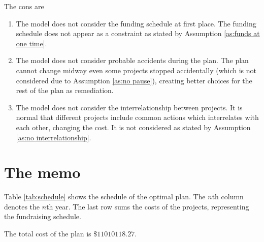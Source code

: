 \documentclass{article}
\begin{document}
The cons are
\begin{enumerate}
\item The model does not consider the funding schedule at first place.
The funding schedule does not appear as a constraint as stated by Assumption \ref{as:funds at one time}.
\item The model does not consider probable accidents during the plan.
The plan cannot change midway even some projects stopped accidentally (which is not considered due to Assumption \ref{as:no pause}), creating better choices for the rest of the plan as remediation.
\item The model does not consider the interrelationship between projects.
It is normal that different projects include common actions which interrelates with each other, changing the cost.
It is not considered as stated by Assumption \ref{as:no interrelationship}.
\end{enumerate}

\newpage

\section{The memo}
\label{sec:memo}

Table \ref{tab:schedule} shows the schedule of the optimal plan.
The $n$th column denotes the $n$th year.
The last row sums the costs of the projects, representing the fundraising schedule.

The total cost of the plan is $\$11010118.27$.
\end{document}
